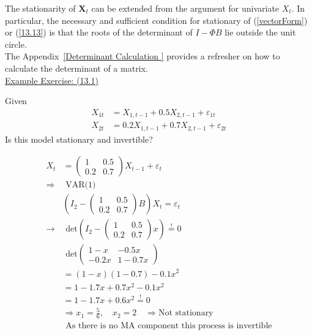 The stationarity of $\mathbf{X}_t$ can be extended from the argument for univariate $X_t$. In particular, the necessary and sufficient condition for stationary of (\ref{vectorForm}) or (\ref{13.13}) is that the roots of the determinant of $I-\Phi B$ lie outside the unit circle. \\

The Appendix~\ref{Determinant Calculation } provides a refresher on how to calculate the determinant of a matrix.\\

\underline{Example Exercise: (13.1)} \\
\begin{footnotesize}
    

\quad Given \begin{align*}
    X_{1t} &= X_{1,t-1}+0.5X_{2,t-1} + \varepsilon_{1t}\\
    X_{2t} &= 0.2 X_{1,t-1} + 0.7 X_{2,t-1} + \varepsilon_{2t}
\end{align*} \quad Is this model stationary and invertible?

\begin{align*}
    X_t &= \begin{pmatrix}
        1 & 0.5 \\
        0.2 & 0.7
    \end{pmatrix}X_{t-1} + \varepsilon_t \\
    \Rightarrow &\text{ VAR(1)} \\
    & \left(I_2 - \begin{pmatrix}
        1 & 0.5 \\
        0.2 & 0.7
    \end{pmatrix}B\right)X_t = \varepsilon_t \\
    \rightarrow &\text{ det}\left(I_2 - \begin{pmatrix}
        1 & 0.5 \\
        0.2 & 0.7
    \end{pmatrix}x\right) \overset{!}{=} 0 \\
    &\text{ det}\begin{pmatrix}
        1-x & -0.5x \\
        -0.2x & 1-0.7x
    \end{pmatrix} \\
    &= (1-x)(1-0.7)-0.1x^2 \\
    &= 1-1.7x + 0.7x^2 -0.1x^2 \\
    &= 1-1.7x + 0.6x^2 \overset{!}{=} 0\\
&\Rightarrow x_1 = \frac{5}{6}, \quad x_2 = 2 \quad \Rightarrow\text{Not stationary}\\
&\text{ As there is no MA component this process is invertible}
\end{align*}

\end{footnotesize}

